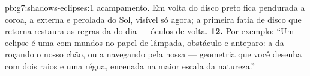 \begin{solution}{pb:g7:shadows-eclipses:1}
acampamento. Em volta do disco preto fica pendurada a coroa, a
 externa e perolada do Sol, visível só agora; a primeira
fatia de disco que retorna restaura as regras da  do dia ---
óculos de volta.
\textbf{12.} Por exemplo: ``Um eclipse é uma  com mundos no
papel de lâmpada, obstáculo e anteparo: a  da  roçando o
nosso chão, ou a  navegando pela nossa --- geometria que você
desenha com dois raios e uma régua, encenada na maior escala da
natureza.''
\end{solution}
